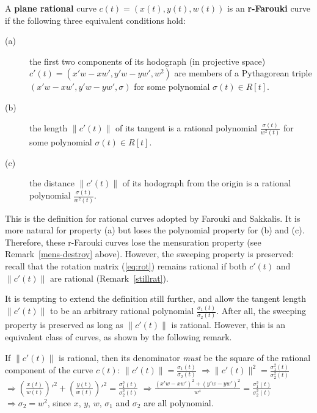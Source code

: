 \begin{dfn}
\label{r-plane-rat}
A {\bf plane rational} curve $c(t) = (x(t),y(t),w(t))$
is an {\bf r-Farouki} curve if the following three equivalent conditions hold:
\begin{description}
\item[(a)]
	the first two components of its hodograph (in projective space)\\
	$c'(t) = (x'w - xw', y'w - yw', w^2)$
	are members of a Pythagorean triple \\
	$(x'w - xw', y'w - yw', \sigma)$
	for some polynomial $\sigma(t) \in R[t]$.
\item[(b)]
	the length $\| c'(t) \|$ of its tangent is a rational polynomial 
	$\frac{\sigma(t)}{w^2(t)}$ for some polynomial $\sigma(t) \in R[t]$.
\item[(c)]
	the distance $\| c'(t) \|$ of its hodograph from the origin
	is a rational polynomial $\frac{\sigma(t)}{w^2(t)}$.
\end{description}
\end{dfn}

This is the definition for rational curves adopted by Farouki and Sakkalis.
It is more natural for property (a) but loses the polynomial property
for (b) and (c).
Therefore, these r-Farouki curves lose the mensuration property (see 
Remark~\ref{mens-destroy} above).
However, the sweeping property is preserved: recall that the rotation matrix
(\ref{eq:rot}) remains rational if both $c'(t)$ and $\|c'(t)\|$ are rational
(Remark~\ref{stillrat}).

It is tempting to extend the definition still further,
and allow the tangent length $\| c'(t) \|$ to be an arbitrary rational
polynomial $\frac{\sigma_1(t)}{\sigma_2(t)}$.
After all, the sweeping property is preserved as long as $\| c'(t) \|$
is rational.
However, this is an equivalent class of curves, as shown by 
the following remark.

\begin{rmk}
If $\| c'(t) \|$ is rational,
then its denominator {\em must} be the square of the rational component
of the curve $c(t)$:
	$\| c'(t) \| = \frac{\sigma_1(t)}{\sigma_2(t)}$
	$\Rightarrow \| c'(t) \|^2 = \frac{\sigma_1^2(t)}{\sigma_2^2(t)}$
	$\Rightarrow (\frac{x(t)}{w(t)})'^2 + (\frac{y(t)}{w(t)})'^2 
				   = \frac{\sigma_1^2(t)}{\sigma_2^2(t)}$
	$\Rightarrow \frac{(x'w - xw')^2 + (y'w - yw')^2}{w^4}
				   = \frac{\sigma_1^2(t)}{\sigma_2^2(t)}$
	$\Rightarrow \sigma_2 = w^2$,
	since $x$, $y$, $w$, $\sigma_1$ and $\sigma_2$ are all polynomial.
\end{rmk}

